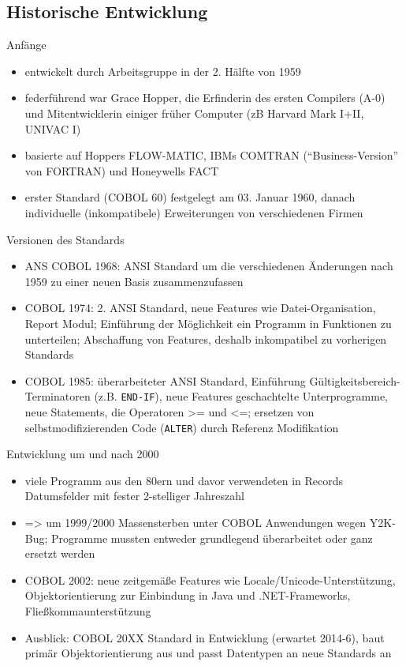 \documentclass{beamer}
\begin{document}
\subsection{Historische Entwicklung}
\begin{frame}{Anfänge}
	\begin{itemize}[<+->]
		\item
			entwickelt durch Arbeitsgruppe in der 2. H\"alfte von 1959
		\item
			federführend war Grace Hopper, die Erfinderin des ersten Compilers (A-0) und Mitentwicklerin einiger fr\"uher Computer (zB Harvard Mark I+II, UNIVAC I)
		\item
			basierte auf Hoppers FLOW-MATIC, IBMs COMTRAN (``Business-Version'' von FORTRAN) und Honeywells FACT
		\item
		erster Standard (COBOL 60) festgelegt am 03. Januar 1960, danach individuelle (inkompatibele) Erweiterungen von verschiedenen Firmen
	\end{itemize}
\end{frame}

\begin{frame}{Versionen des Standards}
	\begin{itemize}[<+->]
		\item
			ANS COBOL 1968: ANSI Standard um die verschiedenen \"Anderungen nach 1959 zu einer neuen Basis zusammenzufassen
		\item
			COBOL 1974: 2. ANSI Standard, neue Features wie Datei-Organisation, Report Modul; Einführung der Möglichkeit ein Programm in Funktionen zu unterteilen; Abschaffung von Features, deshalb inkompatibel zu vorherigen Standards
		\item
			COBOL 1985: \"uberarbeiteter ANSI Standard, Einf\"uhrung G\"ultigkeitsbereich-Terminatoren (z.B. \texttt{END-IF}), neue Features geschachtelte Unterprogramme, neue Statements, die Operatoren >= und <=; ersetzen von selbstmodifizierenden Code (\texttt{ALTER}) durch Referenz Modifikation
	\end{itemize}
\end{frame}

\begin{frame}{Entwicklung um und nach 2000}
	\begin{itemize}[<+->]
		\item
			viele Programm aus den 80ern und davor verwendeten in Records Datumsfelder mit fester 2-stelliger Jahreszahl
		\item
			=> um 1999/2000 Massensterben unter COBOL Anwendungen wegen Y2K-Bug; Programme mussten entweder grundlegend überarbeitet oder ganz ersetzt werden
		\item
			COBOL 2002: neue zeitgemäße Features wie Locale/Unicode-Unterstützung, Objektorientierung zur Einbindung in Java und .NET-Frameworks, Fließkommaunterstützung
		\item
			Ausblick: COBOL 20XX Standard in Entwicklung (erwartet 2014-6), baut primär Objektorientierung aus und passt Datentypen an neue Standards an
		\end{itemize}
\end{frame}
\end{document}

